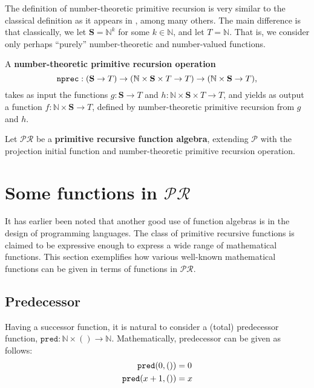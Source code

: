 \begin{remark} The definition of number-theoretic primitive recursion is very
similar to the classical definition as it appears in \cite{dedekind-1888,
goedel-1944, rose-1984, odifreddi-1989}, among many others. The main difference
is that classically, we let $\mathbf{S}=\mathbb{N}^k$ for some $k \in
\mathbb{N}$, and let $T = \mathbb{N}$. That is, we consider only perhaps
``purely'' number-theoretic and number-valued functions. \end{remark}

\begin{definition} A \textbf{number-theoretic primitive recursion operation}
%
$$\mathtt{nprec} : {\mathopen{}\left({\mathbf{S} \rightarrow T}\right)\mathclose{}} \rightarrow {\ensuremath{\mathopen{}\left({\mathbb{N}
\times \mathbf{S} \times T \rightarrow T}\right)\mathclose{}}} \rightarrow {\ensuremath{\mathopen{}\left({\mathbb{N} \times
\mathbf{S} \rightarrow T}\right)\mathclose{}}},$$
%
takes as input the functions $g : \mathbf{S} \rightarrow T$ and $h : \mathbb{N}
\times \mathbf{S} \times T \rightarrow T$, and yields as output a function $f :
\mathbb{N} \times \mathbf{S} \rightarrow T$, defined by number-theoretic
primitive recursion from $g$ and $h$.\end{definition}

\begin{definition} Let $\mathcal{PR}$ be a \textbf{primitive recursive function
algebra}, extending $\mathcal{P}$ with the projection initial function and
number-theoretic primitive recursion operation.\end{definition}

\section{Some functions in $\mathcal{PR}$}

It has earlier been noted that another good use of function algebras is in the
design of programming languages. The class of primitive recursive functions is
claimed to be expressive enough to express a wide range of mathematical
functions. This section exemplifies how various well-known mathematical
functions can be given in terms of functions in $\mathcal{PR}$.

\subsection{Predecessor}

Having a successor function, it is natural to consider a (total) predecessor
function, $\mathtt{pred} : \mathbb{N} \times () \rightarrow \mathbb{N}$.
Mathematically, predecessor can be given as follows:\begin{align*}
%
\mathtt{pred}\p{0,()} &= 0 \\
%
\mathtt{pred}\p{x+1,()} &= x
%
\end{align*}

